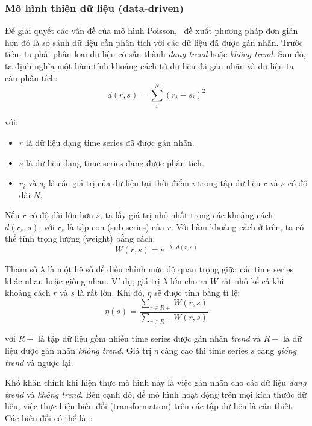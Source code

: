 \subsubsection{Mô hình thiên dữ liệu (data-driven)}
Để giải quyết các vấn đề của mô hình Poisson,
\cite{hendricksonTrendDetectionSocial2015}~đề xuất phương pháp đơn giản hơn đó
là so sánh dữ liệu cần phân tích với các dữ liệu đã được gán nhãn. Trước tiên,
ta phải phân loại dữ liệu có sẵn thành \textit{đang trend} hoặc \textit{không
trend}. Sau đó, ta định nghĩa một hàm tính khoảng cách từ dữ liệu đã gán nhãn
và dữ liệu ta cần phân tích:
\[ d(r, s)=\sum_{i}^{N}\left(r_{i}-s_{i}\right)^{2} \]

với:
\begin{itemize}
	\item $r$ là dữ liệu dạng time series đã được gán nhãn.
	\item $s$ là dữ liệu dạng time series đang được phân tích.
	\item $r_{i}$ và $s_{i}$ là các giá trị của dữ liệu tại thời điểm $i$ trong
	tập dữ liệu $r$ và $s$ có độ dài $N$.
\end{itemize}

Nếu $r$ có độ dài lớn hơn $s$, ta lấy giá trị nhỏ nhất trong các khoảng cách
$d(r_s, s)$, với $r_s$ là tập con (sub-series) của $r$. Với hàm khoảng cách ở
trên, ta có thể tính trọng lượng (weight) bằng cách:
\[ W(r,s)=e^{-\lambda \cdot d(r,s)} \]

Tham số $\lambda$ là một hệ số để điều chỉnh mức độ quan trọng giữa các time
series khác nhau hoặc giống nhau. Ví dụ, giá trị $\lambda$ lớn cho ra $W$ rất
nhỏ kể cả khi khoảng cách $r$ và $s$ là rất lớn. Khi đó, $\eta$ sẽ được tính
bằng tỉ lệ:
\[
\eta(s)=\frac{\sum_{r \in R+} W(r, s)}{\sum_{r \in R-} W(r, s)}
\]

với $R+$ là tập dữ liệu gồm nhiều time series được gán nhãn \textit{trend} và
$R-$ là dữ liệu được gán nhãn \textit{không trend}. Giá trị $\eta$ càng cao thì
time series $s$ càng \textit{giống trend} và ngược lại.

Khó khăn chính khi hiện thực mô hình này là việc gán nhãn cho các dữ liệu
\textit{đang trend} và \textit{không trend}. Bên cạnh đó, để mô hình hoạt động
trên mọi kích thước dữ liệu, việc thực hiện biến đổi (transformation) trên các
tập dữ liệu là cần thiết. Các biến đổi có thể là~\cite{nikolovTrendNoTrend2012}:

